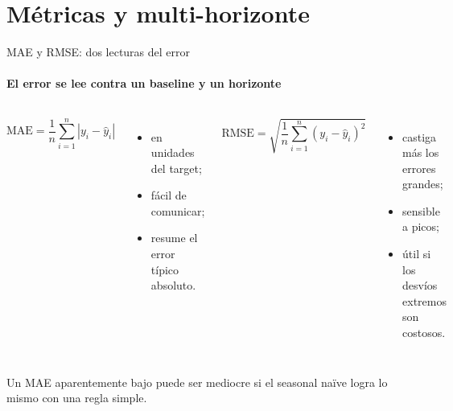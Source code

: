 \documentclass[aspectratio=169,11pt]{beamer}  %
\begin{document}
\section{Métricas y multi-horizonte}

\begin{frame}{MAE y RMSE: dos lecturas del error}
\framesubtitle{El error se lee contra un baseline y un horizonte}
\begin{columns}[T]
{\large\[ \mathrm{MAE} = \frac{1}{n}\sum_{i=1}^{n} |y_i - \hat y_i| \]}
\begin{itemize}\small
\item en unidades del target;
\item fácil de comunicar;
\item resume el error típico absoluto.
\end{itemize}
{\large\[ \mathrm{RMSE} = \sqrt{\frac{1}{n}\sum_{i=1}^{n} (y_i - \hat y_i)^2} \]}
\begin{itemize}\small
\item castiga más los errores grandes;
\item sensible a picos;
\item útil si los desvíos extremos son costosos.
\end{itemize}
\end{columns}
\begin{rulebox}[Cuidado]
\small Un MAE aparentemente bajo puede ser mediocre si el seasonal naïve logra lo mismo con una regla simple.
\end{rulebox}
\end{frame}
\end{document}
